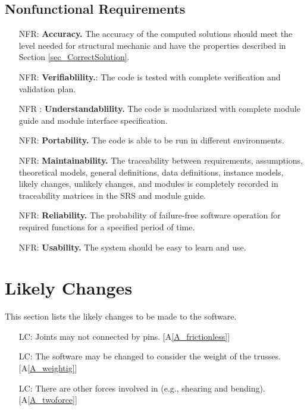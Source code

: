 \documentclass[12pt]{article}
\newcommand{\aref}[1]{A\ref{#1}}
\newcounter{reqnum} %
\newcounter{nonreqnum} %
\newcounter{lcnum} %
\begin{document}
\subsection{Nonfunctional Requirements}

\noindent 

\begin{itemize}
\item [NFR\refstepcounter{nonreqnum}\thenonreqnum \label{NFR_Accuracy}:] 
\textbf{Accuracy.} The accuracy of the computed solutions should meet the level 
needed 
for structural mechanic and have the properties described in Section 
\ref{sec_CorrectSolution}.
\item [NFR\refstepcounter{nonreqnum}\thenonreqnum \label{NFR_Verifiability}:]
\textbf{Verifiablility.}: The code is tested with complete verification and 
validation plan.
\item [NFR\refstepcounter{nonreqnum}\thenonreqnum 
\label{NFR_Understandability}:]
\textbf{Understandablility.} The code is modularized with complete module 
guide and module interface specification.
\item [NFR\refstepcounter{nonreqnum}\thenonreqnum \label{NFR_Portability}:] 
\textbf{Portability.} The code is able to be run in different environments.
\item [NFR\refstepcounter{nonreqnum}\thenonreqnum \label{NFR_Maintainability}:]
\textbf{Maintainability.} The traceability between requirements, assumptions, 
theoretical models, general definitions, data definitions, instance models, 
likely changes, unlikely changes, and modules is completely recorded in 
traceability matrices in the SRS and module guide. 
\item [NFR\refstepcounter{nonreqnum}\thenonreqnum \label{NFR_Reliability}:]  
\textbf{Reliability.} The probability of failure-free software operation 
for required functions for a specified period of time.
\item [NFR\refstepcounter{nonreqnum}\thenonreqnum \label{NFR_Usability}:] 
\textbf{Usability.} The system should be easy to learn and use.

\end{itemize}

\section{Likely Changes}    
This section lists the likely changes to be made to the software.
\noindent \begin{itemize}

\item[LC\refstepcounter{lcnum}\thelcnum\label{LC_notpinconnect}:] Joints may 
not connected by pins. [\aref{A_frictionless}]

\item[LC\refstepcounter{lcnum}\thelcnum\label{LC_weightinclude}:] The 
software may be changed to consider the weight of the trusses.
[\aref{A_weightig}]

\item[LC\refstepcounter{lcnum}\thelcnum\label{LC_otherforce}:] There are other 
forces involved in (e.g., shearing and bending). [\aref{A_twoforce}]

\end{itemize}
\end{document}
